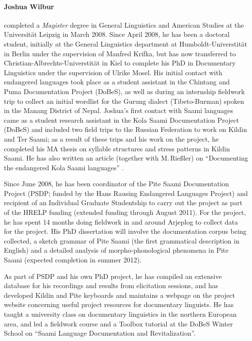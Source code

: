 \documentclass[a4paper,12pt]{article}
\begin{document}
{{{{\paragraph{Joshua Wilbur} completed a \textit{Magister} degree in General Linguistics and American Studies at the Universität Leipzig in March 2008. Since April 2008, he has been a doctoral student, initially at the General Linguistics department at Humboldt-Universtität in Berlin under the supervision of Manfred Krifka, but has now transferred to Christian-Albrechts-Universtität in Kiel to complete his PhD in Documentary Linguistics under the supervision of Ulrike Mosel. His initial contact with endangered languages took place as a student assistant in the Chintang and Puma Documentation Project (DoBeS), as well as during an internship fieldwork trip to collect an initial wordlist for the Gurung dialect (Tibeto-Burman) spoken in the Manang District of Nepal. Joshua's first contact with Saami languages came as a student research assistant in the Kola Saami Documentation Project (DoBeS) and included two field trips to the Russian Federation to work on Kildin and Ter Saami; as a result of these trips and his work on the project, he completed his MA thesis on syllable structures and stress patterns in Kildin Saami. He has also written an article (together with M.\,Rießler) on “Documenting the endangered {K}ola {S}aami languages” \citep{riesler-etal2007}.

Since June 2008, he has been coordinator of the Pite Saami Documentation Project (PSDP; funded by the Hans Rausing Endangered Languages Project) and recipient of an Individual Graduate Studentship to carry out the project as part of the HRELP funding (extended funding through August 2011). For the project, he has spent 14 months doing fieldwork in and around Arjeplog to collect data for the project. His PhD dissertation will involve the documentation corpus being collected, a sketch grammar of Pite Saami (the first grammatical description in English) and a detailed analysis of morpho-phonological phenomena in Pite Saami (expected completion in summer 2012).

As part of PSDP and his own PhD project, he has compiled an extensive database for his recordings and results from elicitation sessions, and has developed Kildin and Pite keyboards and maintains a webpage on the project website concerning useful project resources for documentary linguists. He has taught a university class on documentary linguistics in the northern European area, and led a fieldwork course and a Toolbox tutorial at the DoBeS Winter School on “Saami Language Documentation and Revitalization”.

}}}}
\end{document}
